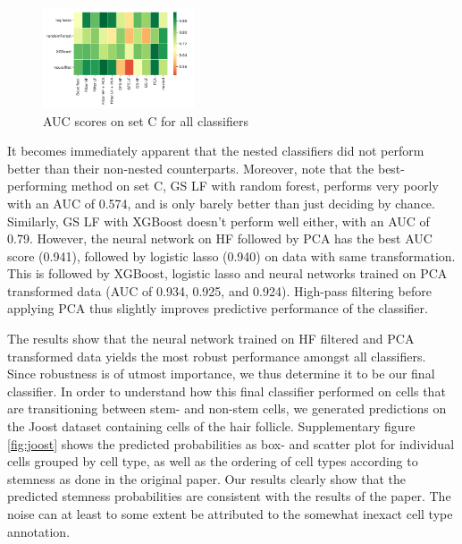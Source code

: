 \documentclass[10pt,conference,compsocconf]{IEEEtran}
\begin{document}
\begin{figure}[H]
	\centering
	\includegraphics[width=0.4\textwidth]{test_auc.png}
	\caption{AUC scores on set C for all classifiers }
	\label{fig:test_acc}
\end{figure}
It becomes immediately apparent that the nested classifiers did not perform better than their non-nested counterparts. Moreover, note that the best-performing method on set C, GS LF with random forest, performs very poorly with an AUC of 0.574, and is only barely better than just deciding by chance. Similarly, GS LF with XGBoost doesn't perform well either, with an AUC of 0.79. However, the neural network on HF followed by PCA has the best AUC score (0.941), followed by logistic lasso (0.940) on data with same transformation. This is followed by XGBoost, logistic lasso and neural networks trained on PCA transformed data (AUC of 0.934, 0.925, and 0.924). High-pass filtering before applying PCA thus slightly improves predictive performance of the classifier.
\par
The results show that the neural network trained on HF filtered and PCA transformed data yields the most robust performance amongst all classifiers. Since robustness is of utmost importance, we thus determine it to be our final classifier. In order to understand how this final classifier performed on cells that are transitioning between stem- and non-stem cells, we generated predictions on the Joost dataset containing cells of the hair follicle. Supplementary figure \ref{fig:joost} shows the predicted probabilities as box- and scatter plot for individual cells grouped by cell type, as well as the ordering of cell types according to stemness as done in the original paper. Our results clearly show that the predicted stemness probabilities are consistent with the results of the paper. The noise can at least to some extent be attributed to the somewhat inexact cell type annotation.
\end{document}
